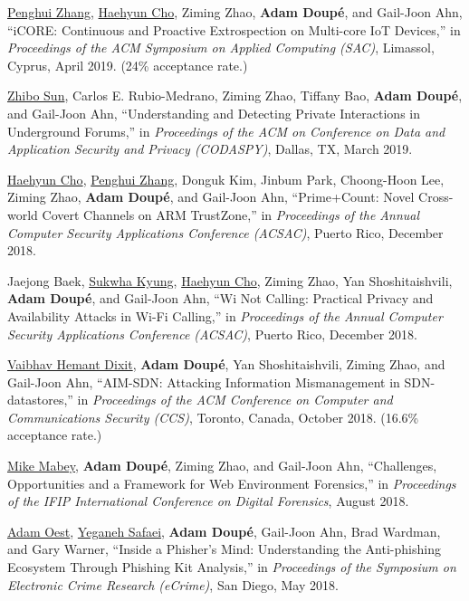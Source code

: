 \documentclass[11pt,letterpaper,sans]{moderncv}
\begin{document}
\begin{etaremune}
 \item \underline{Penghui Zhang}, \underline{Haehyun Cho}, Ziming Zhao, \textbf{Adam Doup\'e}, and Gail-Joon Ahn, ``iCORE: Continuous and Proactive Extrospection on Multi-core IoT Devices,'' in \emph{Proceedings of the ACM Symposium on Applied Computing (SAC)}, Limassol, Cyprus, April 2019. (24\% acceptance rate.)
  
\item \underline{Zhibo Sun}, Carlos E.
Rubio-Medrano, Ziming Zhao, Tiffany Bao, \textbf{Adam Doup\'e}, and Gail-Joon Ahn, ``Understanding and Detecting Private Interactions in Underground Forums,'' in \emph{Proceedings of the ACM on Conference on Data and Application Security and Privacy (CODASPY)}, Dallas, TX, March 2019.

\item \underline{Haehyun Cho}, \underline{Penghui Zhang}, Donguk Kim, Jinbum Park, Choong-Hoon Lee, Ziming Zhao, \textbf{Adam Doup\'e}, and Gail-Joon Ahn, ``Prime+Count: Novel Cross-world Covert Channels on ARM TrustZone,'' in \emph{Proceedings of the Annual Computer Security Applications Conference (ACSAC)}, Puerto Rico, December 2018.

\item Jaejong Baek, \underline{Sukwha Kyung}, \underline{Haehyun Cho}, Ziming Zhao, Yan Shoshitaishvili, \textbf{Adam Doup\'e}, and Gail-Joon Ahn, ``Wi Not Calling: Practical Privacy and Availability Attacks in Wi-Fi Calling,'' in \emph{Proceedings of the Annual Computer Security Applications Conference (ACSAC)}, Puerto Rico, December 2018.

\item \underline{Vaibhav Hemant Dixit}, \textbf{Adam Doup\'e}, Yan
  Shoshitaishvili, Ziming Zhao, and Gail-Joon Ahn, ``AIM-SDN:
  Attacking Information Mismanagement in SDN-datastores,'' in
  \emph{Proceedings of the ACM Conference on Computer and
    Communications Security (CCS)}, Toronto, Canada, October 2018. (16.6\% acceptance rate.)

\item \underline{Mike Mabey}, \textbf{Adam Doup\'e}, Ziming Zhao, and Gail-Joon Ahn, ``Challenges, Opportunities and a Framework for Web Environment Forensics,'' in \emph{Proceedings of the IFIP International Conference on Digital Forensics}, August 2018.
  

\item \underline{Adam Oest}, \underline{Yeganeh Safaei}, \textbf{Adam Doup\'e},
  Gail-Joon Ahn, Brad Wardman, and Gary Warner, ``Inside a Phisher's
  Mind: Understanding the Anti-phishing Ecosystem Through Phishing Kit
  Analysis,'' in \emph{Proceedings of the Symposium on Electronic
    Crime Research (eCrime)}, San Diego, May 2018. 
  

\end{etaremune}
\end{document}
